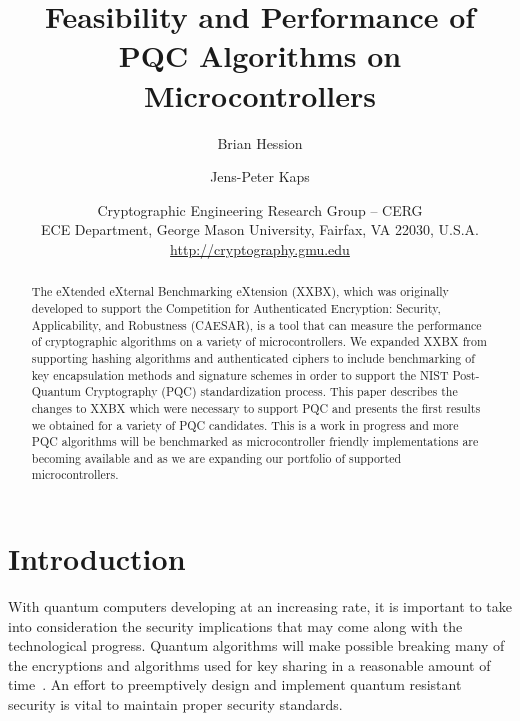 \documentclass[10pt]{article}
\begin{document}
\title{Feasibility and Performance of PQC Algorithms on Microcontrollers %
} 

\author{Brian Hession \and Jens-Peter Kaps}

\date{Cryptographic Engineering Research Group -- CERG\\
ECE Department, George Mason University, Fairfax, VA 22030, U.S.A.\\
\url{http://cryptography.gmu.edu}}%

\maketitle

\begin{abstract}
The eXtended eXternal Benchmarking eXtension (XXBX), which was originally developed
to support the Competition for Authenticated Encryption: Security, Applicability, 
and Robustness (CAESAR), is a tool that can measure the performance of cryptographic 
algorithms on a variety of microcontrollers. We expanded XXBX from supporting 
hashing algorithms and authenticated ciphers to include benchmarking of key encapsulation 
methods and signature schemes in order to support the NIST Post-Quantum
Cryptography (PQC) standardization process. 
This paper describes the changes to XXBX which were necessary to support PQC and 
presents the first results we obtained for a variety of PQC candidates.
This is a work in progress and more PQC algorithms will be benchmarked as 
microcontroller friendly implementations are becoming available and as we are 
expanding our portfolio of supported microcontrollers.
\end{abstract}


\section{Introduction}

With quantum computers developing at an increasing rate, it is important to take into 
consideration the security implications that may come along with the technological progress. 
Quantum algorithms will make possible breaking many of the encryptions and algorithms used for 
key sharing in a reasonable amount of time~\cite{nsareco}.
An effort to preemptively design and implement 
quantum resistant security is vital to maintain proper security standards.
\end{document}
